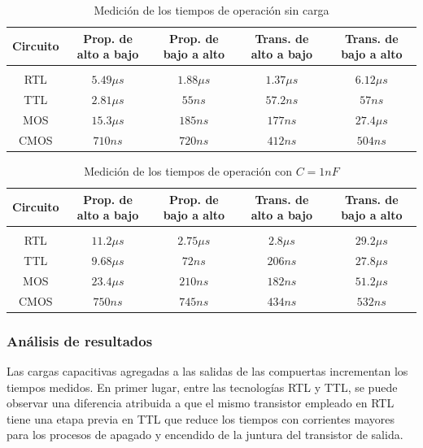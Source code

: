 \begin{table}[H]
    \centering
    \begin{tabular}{c c c c c}
        Circuito & Prop. de alto a bajo & Prop. de bajo a alto & Trans. de alto a bajo & Trans. de bajo a alto \\
        \hline \\
        RTL & $5.49\mu s$ & $1.88\mu s$ & $1.37\mu s$ & $6.12\mu s$ \\
        TTL & $2.81\mu s$ & $55ns$ & $57.2ns$ & $57n s$ \\
        MOS & $15.3\mu s$ & $185ns$ & $177ns$ & $27.4\mu s$ \\
        CMOS & $710ns$ & $720ns$ & $412ns$ & $504ns$ \\
        \hline
    \end{tabular}
    \caption{Medici\'on de los tiempos de operaci\'on sin carga}
\end{table}

\begin{table}[H]
    \centering
    \begin{tabular}{c c c c c}
        Circuito & Prop. de alto a bajo & Prop. de bajo a alto & Trans. de alto a bajo & Trans. de bajo a alto \\
        \hline \\
        RTL & $11.2\mu s$ & $2.75\mu s$ & $2.8\mu s$ & $29.2\mu s$ \\
        TTL & $9.68\mu s$ & $72ns$ & $206ns$ & $27.8 \mu s$ \\
        MOS & $23.4\mu s$ & $210ns$ & $182ns$ & $51.2\mu s$ \\
        CMOS & $750ns$ & $745ns$ & $434ns$ & $532ns$ \\
        \hline
    \end{tabular}
    \caption{Medici\'on de los tiempos de operaci\'on con $C = 1nF$}
\end{table}

\subsubsection{An\'alisis de resultados}
Las cargas capacitivas agregadas a las salidas de las compuertas incrementan los tiempos medidos.
En primer lugar, entre las tecnolog\'ias RTL y TTL, se puede observar una diferencia atribuida a que el mismo transistor empleado en RTL
tiene una etapa previa en TTL que reduce los tiempos con corrientes mayores para los procesos de apagado y encendido de la juntura del transistor de salida.

